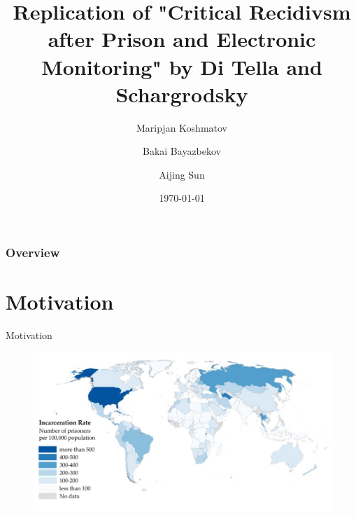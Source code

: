 \documentclass{beamer}
\title[Short title]{Replication of "Critical Recidivsm after Prison and Electronic Monitoring" by Di Tella and Schargrodsky} %
\author{Maripjan Koshmatov \and Bakai Bayazbekov \and Aijing Sun} %
\institute[LMU Munich] %
{
University of Munich \\ %
\medskip
}
\date{\today} %
\begin{document}
\begin{frame}
\titlepage %
\end{frame}

\begin{frame}
\frametitle{Overview} %
\tableofcontents %
\end{frame}

\section{Motivation}
\begin{frame}{Motivation}
\begin{figure}        
\centering
\includegraphics[width=\textwidth]{prison}
\end{figure}
 \end{frame}

\end{document}
